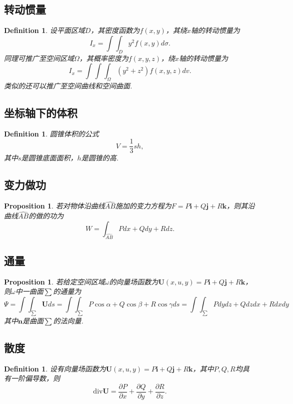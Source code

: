 \documentclass{article}
\newcommand{\mbf}[1]{\bm{#1}}
\newtheorem{proposition}[theorem]{Proposition}
\newtheorem{definition}[theorem]{Definition}
\begin{document}
\subsection{转动惯量}

\begin{definition}
\rm 设平面区域$D$，其密度函数为$f(x,y)$，其绕$x$轴的转动惯量为
$$
I_x = \int\int_D y^2 f(x,y)d\sigma.
$$
同理可推广至空间区域$\Omega$，其概率密度为$f(x,y,z)$，绕$x$轴的转动惯量为
$$
I_x = \int\int\int_\Omega (y^2+z^2) f(x,y,z)dv.
$$
类似的还可以推广至空间曲线和空间曲面. 
\end{definition}

\subsection{坐标轴下的体积}

\begin{definition}
\rm 圆锥体积的公式
$$
V = \frac{1}{3}sh,
$$
其中$s$是圆锥底面面积，$h$是圆锥的高. 
\end{definition}

\subsection{变力做功}

\begin{proposition}
\rm 若对物体沿曲线$\widehat{AB}$施加的变力方程为$F = P\mbf{i}+Q\mbf{j}+R\mbf{k}$，则其沿曲线$\widehat{AB}$的做的功为
$$
W = \int_{\widehat{AB}}  Pdx+Qdy+Rdz. 
$$
\end{proposition}

\subsection{通量}

\begin{proposition}
\rm 若给定空间区域$\omega$的向量场函数为$\mbf{U}(x,u,y)=P\mbf{i}+Q\mbf{j}+R\mbf{k}$，则$\omega$中一曲面$\sum$的通量为
$$
\Psi = \int\int_\sum \mbf{U} ds= \int\int_\sum P\cos\alpha+Q\cos\beta+R\cos\gamma ds  = \int\int_\sum Pdydz + Qdzdx + Rdxdy
$$
其中$\mbf{n}$是曲面$\sum$的法向量. 
\end{proposition}

\subsection{散度}

\begin{definition}
\rm 设有向量场函数为$\mbf{U}(x,u,y)=P\mbf{i}+Q\mbf{j}+R\mbf{k}$，其中$P,Q,R$均具有一阶偏导数，则
$$
\text{div} \mbf{U} = \frac{\partial P}{\partial x} + \frac{\partial Q}{\partial y} + \frac{\partial R}{\partial z}.
$$
\end{definition}
\end{document}
